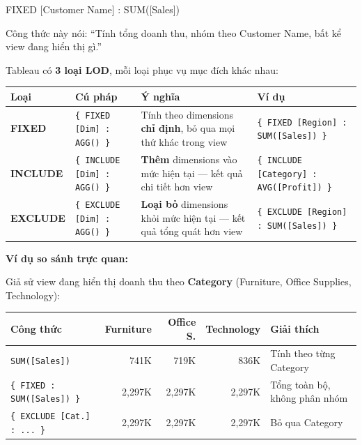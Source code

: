 \documentclass[12pt]{article}
\begin{document}
\begin{aivncodebox}[]
\begin{python}
{ FIXED [Customer Name] : SUM([Sales]) }
\end{python}
\end{aivncodebox}

\noindent Công thức này nói: ``Tính tổng doanh thu, nhóm theo Customer Name, bất kể view đang hiển thị gì.''

\noindent Tableau có \textbf{3 loại LOD}, mỗi loại phục vụ mục đích khác nhau:

\begin{center}
\renewcommand{\arraystretch}{1.4}
\small
\begin{tabularx}{\linewidth}{l l X X}
\toprule
\textbf{Loại} & \textbf{Cú pháp} & \textbf{Ý nghĩa} & \textbf{Ví dụ} \\
\midrule
\textbf{FIXED} & \texttt{\{ FIXED [Dim] : AGG() \}} & Tính theo dimensions \textbf{chỉ định}, bỏ qua mọi thứ khác trong view & \texttt{\{ FIXED [Region] : SUM([Sales]) \}} \\
\textbf{INCLUDE} & \texttt{\{ INCLUDE [Dim] : AGG() \}} & \textbf{Thêm} dimensions vào mức hiện tại --- kết quả chi tiết hơn view & \texttt{\{ INCLUDE [Category] : AVG([Profit]) \}} \\
\textbf{EXCLUDE} & \texttt{\{ EXCLUDE [Dim] : AGG() \}} & \textbf{Loại bỏ} dimensions khỏi mức hiện tại --- kết quả tổng quát hơn view & \texttt{\{ EXCLUDE [Region] : SUM([Sales]) \}} \\
\bottomrule
\end{tabularx}
\end{center}

\noindent \textbf{Ví dụ so sánh trực quan:}

\noindent Giả sử view đang hiển thị doanh thu theo \textbf{Category} (Furniture, Office Supplies, Technology):

\begin{center}
\renewcommand{\arraystretch}{1.4}
\small
\begin{tabularx}{\linewidth}{X r r r X}
\toprule
\textbf{Công thức} & \textbf{Furniture} & \textbf{Office S.} & \textbf{Technology} & \textbf{Giải thích} \\
\midrule
\texttt{SUM([Sales])} & 741K & 719K & 836K & Tính theo từng Category \\
\texttt{\{ FIXED : SUM([Sales]) \}} & 2,297K & 2,297K & 2,297K & Tổng toàn bộ, không phân nhóm \\
\texttt{\{ EXCLUDE [Cat.] : ... \}} & 2,297K & 2,297K & 2,297K & Bỏ qua Category \\
\bottomrule
\end{tabularx}
\end{center}
\end{document}
